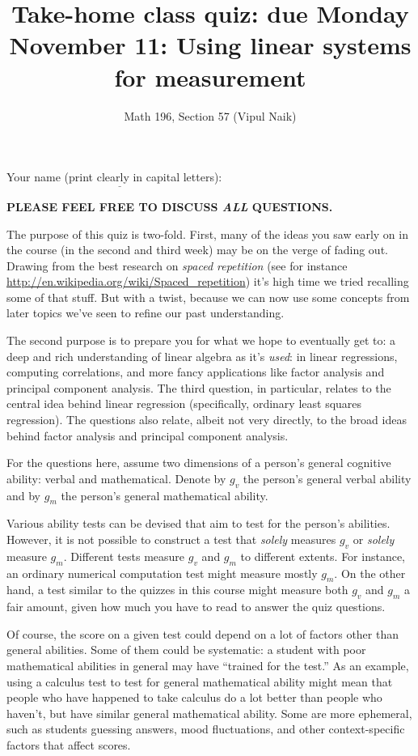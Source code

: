 \documentclass[10pt]{amsart}
\title{Take-home class quiz: due Monday November 11: Using linear systems for measurement}
\author{Math 196, Section 57 (Vipul Naik)}
\begin{document}
\maketitle

Your name (print clearly in capital letters): $\underline{\qquad\qquad\qquad\qquad\qquad\qquad\qquad\qquad\qquad\qquad}$

{\bf PLEASE FEEL FREE TO DISCUSS {\em ALL} QUESTIONS.}

The purpose of this quiz is two-fold. First, many of the ideas you saw
early on in the course (in the second and third week) may be on the
verge of fading out. Drawing from the best research on {\em spaced
  repetition} (see for instance
\url{http://en.wikipedia.org/wiki/Spaced_repetition}) it's high time
we tried recalling some of that stuff. But with a twist, because we
can now use some concepts from later topics we've seen to refine our
past understanding.

The second purpose is to prepare you for what we hope to eventually
get to: a deep and rich understanding of linear algebra as it's {\em
  used}: in linear regressions, computing correlations, and more fancy
applications like factor analysis and principal component
analysis. The third question, in particular, relates to the central
idea behind linear regression (specifically, ordinary least squares
regression). The questions also relate, albeit not very directly, to the
broad ideas behind factor analysis and principal component analysis.

\vspace{0.5in}

For the questions here, assume two dimensions of a person's general
cognitive ability: verbal and mathematical. Denote by $g_v$ the
person's general verbal ability and by $g_m$ the person's general
mathematical ability.

Various ability tests can be devised that aim to test for the person's
abilities. However, it is not possible to construct a test that {\em
  solely} measures $g_v$ or {\em solely} measure $g_m$. Different
tests measure $g_v$ and $g_m$ to different extents. For instance, an
ordinary numerical computation test might measure mostly $g_m$. On the
other hand, a test similar to the quizzes in this course might measure
both $g_v$ and $g_m$ a fair amount, given how much you have to read to
answer the quiz questions.

Of course, the score on a given test could depend on a lot of factors
other than general abilities. Some of them could be systematic: a
student with poor mathematical abilities in general may have ``trained
for the test.'' As an example, using a calculus test to test for
general mathematical ability might mean that people who have happened
to take calculus do a lot better than people who haven't, but have
similar general mathematical ability. Some are more ephemeral, such as
students guessing answers, mood fluctuations, and other
context-specific factors that affect scores.
\end{document}
